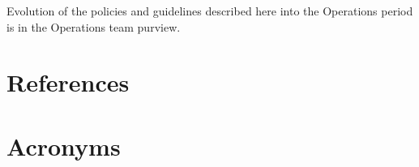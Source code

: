 \documentclass[SE,authoryear,toc,lsstdraft]{lsstdoc}
\begin{document}
Evolution of the policies and guidelines described here into the Operations period is in the Operations team purview.


\appendix
\section{References} \label{sec:bib}
\renewcommand{\refname}{} %


\section{Acronyms} \label{sec:acronyms}

\end{document}
